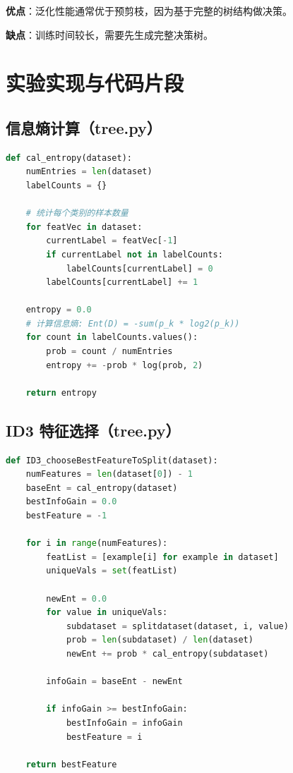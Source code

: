 \documentclass[UTF8]{ctexart}
\begin{document}
\noindent \textbf{优点}：泛化性能通常优于预剪枝，因为基于完整的树结构做决策。

\noindent \textbf{缺点}：训练时间较长，需要先生成完整决策树。

\section{实验实现与代码片段}

\subsection{信息熵计算（tree.py）}
\begin{lstlisting}[language=Python, caption=信息熵计算]
def cal_entropy(dataset):
    numEntries = len(dataset)
    labelCounts = {}
    
    # 统计每个类别的样本数量
    for featVec in dataset:
        currentLabel = featVec[-1]
        if currentLabel not in labelCounts:
            labelCounts[currentLabel] = 0
        labelCounts[currentLabel] += 1
    
    entropy = 0.0
    # 计算信息熵: Ent(D) = -sum(p_k * log2(p_k))
    for count in labelCounts.values():
        prob = count / numEntries
        entropy += -prob * log(prob, 2)
    
    return entropy
\end{lstlisting}

\subsection{ID3 特征选择（tree.py）}
\begin{lstlisting}[language=Python, caption=ID3 算法的特征选择]
def ID3_chooseBestFeatureToSplit(dataset):
    numFeatures = len(dataset[0]) - 1
    baseEnt = cal_entropy(dataset)
    bestInfoGain = 0.0
    bestFeature = -1
    
    for i in range(numFeatures):
        featList = [example[i] for example in dataset]
        uniqueVals = set(featList)
        
        newEnt = 0.0
        for value in uniqueVals:
            subdataset = splitdataset(dataset, i, value)
            prob = len(subdataset) / len(dataset)
            newEnt += prob * cal_entropy(subdataset)
        
        infoGain = baseEnt - newEnt
        
        if infoGain >= bestInfoGain:
            bestInfoGain = infoGain
            bestFeature = i
    
    return bestFeature
\end{lstlisting}
\end{document}
